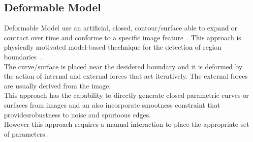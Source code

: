 \documentclass{standalone}
\begin{document}
		\subsection{Deformable Model}
			Deformable Model use an artificial, closed, contour/surface able to expand or contract over time and conforme to a specific image feature~\cite{INP:Withey}. This approach is physically motivated model-based thechnique for the detection of region boundaries~\cite{ART:Pham}.\\
			The curve/surface is placed near the desidered boundary and it is deformed by the action of internal and external forces that act iteratively. The external forces are usually derived from the image.\\
			This approach has the capability to directly generate closed parametric curves or surfaces from images and  an also incorporate smootness constraint that providesrobustness to noise and spurioous edges. \\
			However this approach requires a manual interaction to place the appropriate set of parameters.   
	
\end{document}
